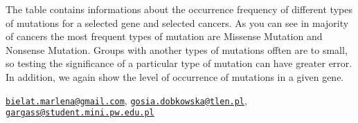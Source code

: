The table contains informations about the occurrence frequency of
different types of mutations for a selected gene and selected cancers.
As you can see in majority of cancers the most frequent types of
mutation are Missense Mutation and Nonsense Mutation. Groups with
another types of mutations offten are to small, so testing the
significance of a particular type of mutation can have greater error. In
addition, we again show the level of occurrence of mutations in a given
gene.

\citep{R}



\address{%
Marlena Bielat, \href{bielat.marlena@gmail.com}{\nolinkurl{bielat.marlena@gmail.com}}\\
Małgorzata Dobkowska, \href{gosia.dobkowska@tlen.pl}{\nolinkurl{gosia.dobkowska@tlen.pl}} \\
Sebastian Gargas, \href{gargass@student.mini.pw.edu.pl}{\nolinkurl{gargass@student.mini.pw.edu.pl}}\\
MiNI Warsaw University of Technology\\
\\
}

\address{%
Marlena Bielat, Małgorzata Dobkowska, Sebastian Gargas\\
MiNI Warsaw University of Technology\\
\\
}
\href{mailto:bielat.marlena@gmail.com}{\nolinkurl{bielat.marlena@gmail.com}},
\href{mailto:gosia.dobkowska@tlen.pl}{\nolinkurl{gosia.dobkowska@tlen.pl}},
\href{mailto:gargass@student.mini.pw.edu.pl}{\nolinkurl{gargass@student.mini.pw.edu.pl}}

